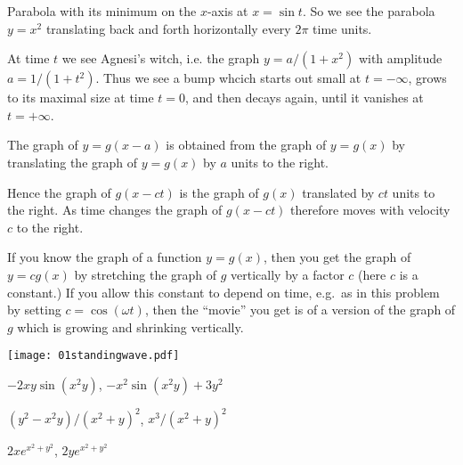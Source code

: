 \item[{\bfseries(III5.14g)}]

Parabola with its minimum on the $x$-axis at $x=\sin t$.
So we see the parabola $y=x^2$ translating back and forth horizontally
every $2\pi$ time units.
\bigskip

\item[{\bfseries(III5.14j)}]

At time $t$ we see Agnesi's witch, i.e. the graph $y= a/(1+x^2)$
with amplitude $a=1/(1+t^2)$.  Thus we see a bump whcich starts out small
 at $t=-\infty$, grows to its maximal size at time $t=0$, and then decays
again, until it vanishes at $t=+\infty$.
\bigskip

\item[{\bfseries(III5.16)}]

The graph of $y=g(x-a)$ is obtained from the graph of $y=g(x)$ by
translating the graph of $y=g(x)$ by $a$ units to the right.

Hence the graph of $g(x-ct)$ is the graph of $g(x)$ translated by $ct$
units to the right.  As time changes the graph of $g(x-ct)$ therefore
moves with velocity $c$ to the right.
\bigskip

\item[{\bfseries(III5.17)}]

If you know the graph of a function $y=g(x)$, then you get
the graph of $y=cg(x)$ by stretching the graph of $g$ vertically by
a factor $c$ (here $c$ is a constant.)
If you allow this constant to depend on time, e.g.\ as in this
problem by setting $c=\cos(\omega t)$, then the ``movie'' you get is of a
version of the graph of $g$ which is growing and shrinking vertically.

\begin{center}
    \texttt{[image: 01standingwave.pdf]}
\end{center}
\bigskip

\item[{\bfseries(IV3.2b)}]

$-2xy\sin(x^2y)$, $-x^2\sin(x^2y)+3y^2$
\bigskip

\item[{\bfseries(IV3.2c)}]

$(y^2-x^2y)/(x^2+y)^2$, $x^3/(x^2+y)^2$
\bigskip

\item[{\bfseries(IV3.2g)}]

$2xe^{x^2+y^2}$, $2ye^{x^2+y^2}$
\bigskip

\item[{\bfseries(IV3.2h)}]

